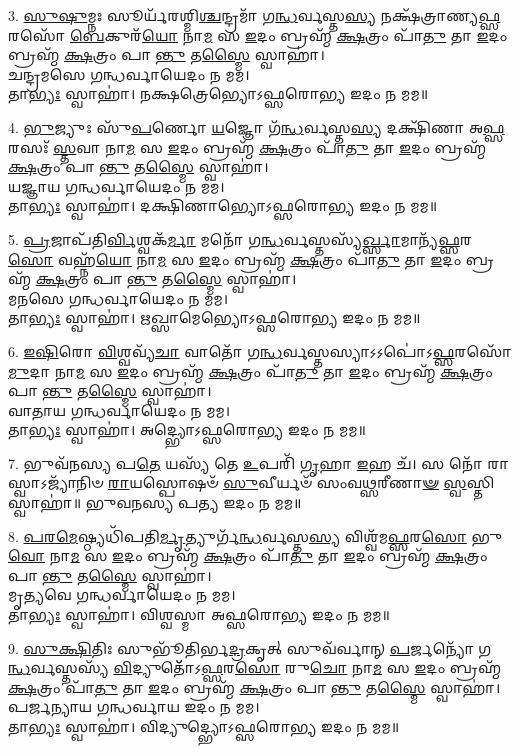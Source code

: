 3. \ul{𑌸𑍁}\-\-\ul{𑌷𑍁}\-𑌮𑍍𑌨𑌃 𑌸𑍂𑌰𑍍𑌯᳴𑌰𑌶𑍍𑌮𑌿\-\ul{𑌶𑍍𑌚}\-𑌨𑍍𑌦𑍍𑌰𑌮𑌾᳴ 𑌗\-\ul{𑌨𑍍𑌧}\-𑌰𑍍𑌵𑌸𑍍𑌤\-\ul{𑌸𑍍𑌯} 𑌨𑌕𑍍𑌷᳴𑌤𑍍𑌰𑌾𑌣𑍍𑌯\-\ul{𑌫𑍍𑌸}\-𑌰𑌸𑍋᳴ \ul{𑌬𑍇}\-𑌕𑍁𑌰᳴\-\ul{𑌯𑍋} 𑌨𑌾\-\ul{𑌮} 𑌸 \ul{𑌇}\-𑌦𑌂 𑌬𑍍𑌰𑌹𑍍𑌮᳴ \ul{𑌕𑍍𑌷}\-𑌤𑍍𑌰𑌂 𑌪𑌾᳴\-\ul{𑌤𑍁} 𑌤𑌾 \ul{𑌇}\-𑌦𑌂 𑌬𑍍𑌰𑌹𑍍𑌮᳴ \ul{𑌕𑍍𑌷}\-𑌤𑍍𑌰𑌂 𑌪𑌾\-\ul{𑌨𑍍𑌤𑍁} 𑌤\-\ul{𑌸𑍍𑌮𑍈} 𑌸𑍍𑌵𑌾𑌹𑌾॑।\\
𑌚𑌨𑍍𑌦𑍍𑌰𑌮𑌸𑍇 𑌗𑌨𑍍𑌧𑌰𑍍𑌵𑌾𑌯𑍇𑌦𑌂 𑌨 𑌮𑌮।\\
𑌤𑌾\-\ul{𑌭𑍍𑌯𑌃} 𑌸𑍍𑌵𑌾𑌹𑌾॑। 𑌨𑌕𑍍𑌷𑌤𑍍𑌰𑍇𑌭𑍍𑌯𑍋𑌽𑌫𑍍𑌸𑌰𑍋𑌭𑍍𑌯 𑌇𑌦𑌂 𑌨 𑌮𑌮॥

4. \ul{𑌭𑍁}\-𑌜𑍍𑌯𑍁𑌃 𑌸𑍁᳴\-\ul{𑌪}\-𑌰𑍍𑌣𑍋 \ul{𑌯}\-𑌜𑍍𑌞𑍋 𑌗᳴\-\ul{𑌨𑍍𑌧}\-𑌰𑍍𑌵𑌸𑍍𑌤\-\ul{𑌸𑍍𑌯} 𑌦𑌕𑍍𑌷𑌿᳴𑌣𑌾 𑌅\-\ul{𑌫𑍍𑌸}\-𑌰𑌸𑌃᳴ \ul{𑌸𑍍𑌤}\-𑌵𑌾 𑌨𑌾\-\ul{𑌮} 𑌸 \ul{𑌇}\-𑌦𑌂 𑌬𑍍𑌰𑌹𑍍𑌮᳴ \ul{𑌕𑍍𑌷}\-𑌤𑍍𑌰𑌂 𑌪𑌾᳴\-\ul{𑌤𑍁} 𑌤𑌾 \ul{𑌇}\-𑌦𑌂 𑌬𑍍𑌰𑌹𑍍𑌮᳴ \ul{𑌕𑍍𑌷}\-𑌤𑍍𑌰𑌂 𑌪𑌾\-\ul{𑌨𑍍𑌤𑍁} 𑌤\-\ul{𑌸𑍍𑌮𑍈} 𑌸𑍍𑌵𑌾𑌹𑌾॑।\\
𑌯𑌜𑍍𑌞𑌾𑌯 𑌗𑌨𑍍𑌧𑌰𑍍𑌵𑌾𑌯𑍇𑌦𑌂 𑌨 𑌮𑌮।\\
𑌤𑌾\-\ul{𑌭𑍍𑌯𑌃} 𑌸𑍍𑌵𑌾𑌹𑌾॑। 𑌦𑌕𑍍𑌷𑌿𑌣𑌾𑌭𑍍𑌯𑍋𑌽𑌫𑍍𑌸𑌰𑍋𑌭𑍍𑌯 𑌇𑌦𑌂 𑌨 𑌮𑌮॥

5. \ul{𑌪𑍍𑌰}\-𑌜𑌾𑌪᳴𑌤𑌿\-\ul{𑌰𑍍𑌵𑌿}\-𑌶𑍍𑌵𑌕᳴\-\ul{𑌰𑍍𑌮𑌾} 𑌮𑌨𑍋᳴ 𑌗\-\ul{𑌨𑍍𑌧}\-𑌰𑍍𑌵𑌸𑍍𑌤𑌸𑍍𑌯᳴\-\ul{𑌰𑍍𑌖𑍍𑌸𑌾}\-𑌮𑌾𑌨𑍍𑌯᳴\-\ul{𑌫𑍍𑌸}\-𑌰\-\ul{𑌸𑍋} 𑌵𑌹𑍍𑌨᳴\-\ul{𑌯𑍋} 𑌨𑌾\-\ul{𑌮} 𑌸 \ul{𑌇}\-𑌦𑌂 𑌬𑍍𑌰𑌹𑍍𑌮᳴ \ul{𑌕𑍍𑌷}\-𑌤𑍍𑌰𑌂 𑌪𑌾᳴\-\ul{𑌤𑍁} 𑌤𑌾 \ul{𑌇}\-𑌦𑌂 𑌬𑍍𑌰𑌹𑍍𑌮᳴ \ul{𑌕𑍍𑌷}\-𑌤𑍍𑌰𑌂 𑌪𑌾\-\ul{𑌨𑍍𑌤𑍁} 𑌤\-\ul{𑌸𑍍𑌮𑍈} 𑌸𑍍𑌵𑌾𑌹𑌾॑।\\
𑌮𑌨𑌸𑍇 𑌗𑌨𑍍𑌧𑌰𑍍𑌵𑌾𑌯𑍇𑌦𑌂 𑌨 𑌮𑌮।\\
𑌤𑌾\-\ul{𑌭𑍍𑌯𑌃} 𑌸𑍍𑌵𑌾𑌹𑌾॑। 𑌋𑌖𑍍𑌸𑌾𑌮𑍇𑌭𑍍𑌯𑍋𑌽𑌫𑍍𑌸𑌰𑍋𑌭𑍍𑌯 𑌇𑌦𑌂 𑌨 𑌮𑌮॥

6. \ul{𑌇}\-\-\ul{𑌷𑌿}\-𑌰𑍋 \ul{𑌵𑌿}\-𑌶𑍍𑌵𑌵𑍍𑌯᳴\-\ul{𑌚𑌾} 𑌵𑌾𑌤𑍋᳴ 𑌗\-\ul{𑌨𑍍𑌧}\-𑌰𑍍𑌵𑌸𑍍𑌤𑌸𑍍𑌯𑌾𑌽𑌽𑌪𑍋॑𑌽\-\ul{𑌫𑍍𑌸}\-𑌰𑌸𑍋᳴ \ul{𑌮𑍁}\-𑌦𑌾 𑌨𑌾\-\ul{𑌮} 𑌸 \ul{𑌇}\-𑌦𑌂 𑌬𑍍𑌰𑌹𑍍𑌮᳴ \ul{𑌕𑍍𑌷}\-𑌤𑍍𑌰𑌂 𑌪𑌾᳴\-\ul{𑌤𑍁} 𑌤𑌾 \ul{𑌇}\-𑌦𑌂 𑌬𑍍𑌰𑌹𑍍𑌮᳴ \ul{𑌕𑍍𑌷}\-𑌤𑍍𑌰𑌂 𑌪𑌾\-\ul{𑌨𑍍𑌤𑍁} 𑌤\-\ul{𑌸𑍍𑌮𑍈} 𑌸𑍍𑌵𑌾𑌹𑌾॑।\\
𑌵𑌾𑌤𑌾𑌯 𑌗𑌨𑍍𑌧𑌰𑍍𑌵𑌾𑌯𑍇𑌦𑌂 𑌨 𑌮𑌮।\\
𑌤𑌾\-\ul{𑌭𑍍𑌯𑌃} 𑌸𑍍𑌵𑌾𑌹𑌾॑। 𑌅𑌦𑍍𑌭𑍍𑌯𑍋𑌽𑌫𑍍𑌸𑌰𑍋𑌭𑍍𑌯 𑌇𑌦𑌂 𑌨 𑌮𑌮॥

7. 𑌭𑍁𑌵᳴𑌨𑌸𑍍𑌯 𑌪\-\ul{𑌤𑍇} 𑌯𑌸𑍍𑌯᳴ 𑌤𑍇 \ul{𑌉}\-𑌪𑌰𑌿᳴ \ul{𑌗𑍃}\-𑌹𑌾 \ul{𑌇}\-𑌹 𑌚᳴।
𑌸 𑌨𑍋᳴ 𑌰𑌾𑌸𑍍𑌵𑌾𑌽𑌜𑍍𑌯𑌾᳴𑌨𑌿𑍞 \ul{𑌰𑌾}\-𑌯𑌸𑍍𑌪𑍋𑌷𑍞᳴ \ul{𑌸𑍁}\-𑌵𑍀𑌰𑍍𑌯𑍞᳴ 𑌸𑌂𑌵\-\ul{𑌥𑍍𑌸}\-𑌰𑍀𑌣𑌾\-\ul{𑍟} \ul{𑌸𑍍𑌵}\-𑌸𑍍𑌤𑌿 𑌸𑍍𑌵𑌾𑌹𑌾॑॥ 𑌭𑍁𑌵𑌨𑌸𑍍𑌯 𑌪𑌤𑍍𑌯 𑌇𑌦𑌂 𑌨 𑌮𑌮॥

8. \ul{𑌪}\-\-\ul{𑌰}\-\-\ul{𑌮𑍇}\-𑌷𑍍𑌠𑍍𑌯𑌧𑌿᳴𑌪𑌤𑌿\-\ul{𑌰𑍍𑌮𑍃}\-𑌤𑍍𑌯𑍁𑌰𑍍𑌗᳴\-\ul{𑌨𑍍𑌧}\-𑌰𑍍𑌵𑌸𑍍𑌤\-\ul{𑌸𑍍𑌯} 𑌵𑌿𑌶𑍍𑌵᳴𑌮\-\ul{𑌫𑍍𑌸}\-𑌰\-\ul{𑌸𑍋} 𑌭𑍁\-\ul{𑌵𑍋} 𑌨𑌾\-\ul{𑌮} 𑌸 \ul{𑌇}\-𑌦𑌂 𑌬𑍍𑌰𑌹𑍍𑌮᳴ \ul{𑌕𑍍𑌷}\-𑌤𑍍𑌰𑌂 𑌪𑌾᳴\-\ul{𑌤𑍁} 𑌤𑌾 \ul{𑌇}\-𑌦𑌂 𑌬𑍍𑌰𑌹𑍍𑌮᳴ \ul{𑌕𑍍𑌷}\-𑌤𑍍𑌰𑌂 𑌪𑌾\-\ul{𑌨𑍍𑌤𑍁} 𑌤\-\ul{𑌸𑍍𑌮𑍈} 𑌸𑍍𑌵𑌾𑌹𑌾॑।\\
𑌮𑍃𑌤𑍍𑌯𑌵𑍇 𑌗𑌨𑍍𑌧𑌰𑍍𑌵𑌾𑌯𑍇𑌦𑌂 𑌨 𑌮𑌮।\\
𑌤𑌾\-\ul{𑌭𑍍𑌯𑌃} 𑌸𑍍𑌵𑌾𑌹𑌾॑। 𑌵𑌿𑌶𑍍𑌵𑌸𑍍𑌮𑌾 𑌅𑌫𑍍𑌸𑌰𑍋𑌭𑍍𑌯 𑌇𑌦𑌂 𑌨 𑌮𑌮॥

9. \ul{𑌸𑍁}\-\-\ul{𑌕𑍍𑌷𑌿}\-𑌤𑌿𑌃 𑌸𑍁𑌭𑍂᳴𑌤𑌿𑌰𑍍𑌭\-\ul{𑌦𑍍𑌰}\-𑌕𑍃𑌤𑍍 𑌸𑍁𑌵᳴𑌰𑍍𑌵𑌾𑌨𑍍 \ul{𑌪}\-𑌰𑍍𑌜𑌨𑍍𑌯𑍋᳴ 𑌗\-\ul{𑌨𑍍𑌧}\-𑌰𑍍𑌵𑌸𑍍𑌤𑌸𑍍𑌯᳴ \ul{𑌵𑌿}\-𑌦𑍍𑌯𑍁𑌤𑍋᳴᳴𑌽\-\ul{𑌫𑍍𑌸}\-𑌰\-\ul{𑌸𑍋} 𑌰𑍁\-\ul{𑌚𑍋} 𑌨𑌾\-\ul{𑌮} 𑌸 \ul{𑌇}\-𑌦𑌂 𑌬𑍍𑌰𑌹𑍍𑌮᳴ \ul{𑌕𑍍𑌷}\-𑌤𑍍𑌰𑌂 𑌪𑌾᳴\-\ul{𑌤𑍁} 𑌤𑌾 \ul{𑌇}\-𑌦𑌂 𑌬𑍍𑌰𑌹𑍍𑌮᳴ \ul{𑌕𑍍𑌷}\-𑌤𑍍𑌰𑌂 𑌪𑌾\-\ul{𑌨𑍍𑌤𑍁} 𑌤\-\ul{𑌸𑍍𑌮𑍈} 𑌸𑍍𑌵𑌾𑌹𑌾॑। 𑌪𑌰𑍍𑌜𑌨𑍍𑌯𑌾𑌯 𑌗𑌨𑍍𑌧𑌰𑍍𑌵𑌾𑌯 𑌇𑌦𑌂 𑌨 𑌮𑌮।\\
𑌤𑌾\-\ul{𑌭𑍍𑌯𑌃} 𑌸𑍍𑌵𑌾𑌹𑌾॑। 𑌵𑌿𑌦𑍍𑌯𑍁𑌦𑍍𑌭𑍍𑌯𑍋𑌽𑌫𑍍𑌸𑌰𑍋𑌭𑍍𑌯 𑌇𑌦𑌂 𑌨 𑌮𑌮॥

